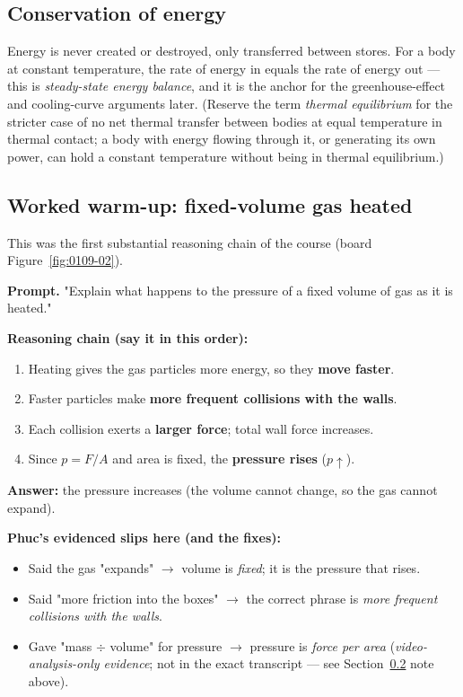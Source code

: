 \documentclass[11pt,a4paper]{article}
\begin{document}
\subsection{Conservation of energy}
Energy is never created or destroyed, only transferred between stores. For a body at
constant temperature, the rate of energy in equals the rate of energy out --- this is
\emph{steady-state energy balance}, and it is the anchor for the greenhouse-effect and
cooling-curve arguments later. (Reserve the term \emph{thermal equilibrium} for the
stricter case of no net thermal transfer between bodies at equal temperature in thermal
contact; a body with energy flowing through it, or generating its own power, can hold a
constant temperature without being in thermal equilibrium.)

\subsection{Worked warm-up: fixed-volume gas heated}
\label{sec:fixedgas-warmup}
This was the first substantial reasoning chain of the course (board Figure~\ref{fig:0109-02}).

\begin{plainbox}
\textbf{Prompt.} "Explain what happens to the pressure of a fixed volume of gas as it is
heated."

\smallskip
\textbf{Reasoning chain (say it in this order):}
\begin{enumerate}[leftmargin=1.5em,itemsep=1pt]
  \item Heating gives the gas particles more energy, so they \textbf{move faster}.
  \item Faster particles make \textbf{more frequent collisions with the walls}.
  \item Each collision exerts a \textbf{larger force}; total wall force increases.
  \item Since $p = F/A$ and area is fixed, the \textbf{pressure rises} ($p\uparrow$).
\end{enumerate}
\textbf{Answer:} the pressure increases (the volume cannot change, so the gas cannot
expand).
\end{plainbox}

\begin{watchbox}
\textbf{Phuc's evidenced slips here (and the fixes):}
\begin{itemize}[leftmargin=1.3em,itemsep=1pt]
  \item Said the gas "expands" $\to$ volume is \emph{fixed}; it is the pressure that rises.
  \item Said "more friction into the boxes" $\to$ the correct phrase is \emph{more
        frequent collisions with the walls}.
  \item Gave "mass $\div$ volume" for pressure $\to$ pressure is \emph{force per area}
        (\emph{video-analysis-only evidence}; not in the exact transcript --- see
        Section~\ref{sec:fixedgas-warmup} note above).
\end{itemize}
\end{watchbox}
\end{document}
